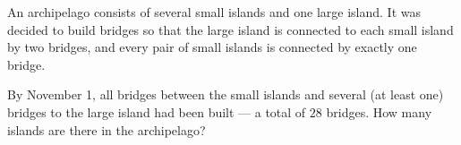An archipelago consists of several small islands and one large island. It was decided to build bridges so that the large island is connected to each small island by two bridges, and every pair of small islands is connected by exactly one bridge.



By November 1, all bridges between the small islands and several (at least one) bridges to the large island had been built --- a total of $28$ bridges. How many islands are there in the archipelago?
